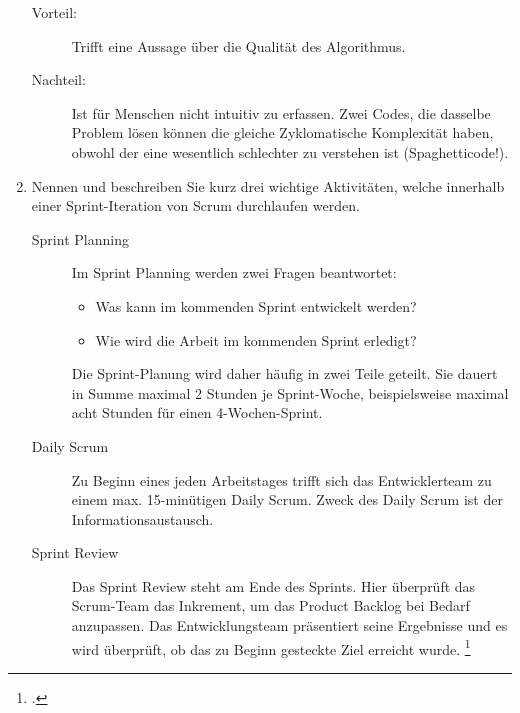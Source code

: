 \documentclass{bschlangaul-aufgabe}
\begin{document}
\begin{enumerate}
\begin{bAntwort}

\begin{description}
\item[Vorteil:]

Trifft eine Aussage über die Qualität des Algorithmus.

\item[Nachteil:]

Ist für Menschen nicht intuitiv zu erfassen. Zwei Codes, die dasselbe
Problem lösen können die gleiche Zyklomatische Komplexität haben, obwohl
der eine wesentlich schlechter zu verstehen ist (Spaghetticode!).
\end{description}
\end{bAntwort}


\item Nennen und beschreiben Sie kurz drei wichtige Aktivitäten, welche
innerhalb einer Sprint-Iteration von Scrum durchlaufen werden.

\begin{bAntwort}
\begin{description}
\item[Sprint Planning]

Im Sprint Planning werden zwei Fragen beantwortet:

\begin{itemize}
\item Was kann im kommenden Sprint entwickelt werden?
\item Wie wird die Arbeit im kommenden Sprint erledigt?
\end{itemize}

Die Sprint-Planung wird daher häufig in zwei Teile geteilt. Sie dauert
in Summe maximal 2 Stunden je Sprint-Woche, beispielsweise maximal acht
Stunden für einen 4-Wochen-Sprint.

\item[Daily Scrum]

Zu Beginn eines jeden Arbeitstages trifft sich das Entwicklerteam zu
einem max. 15-minütigen Daily Scrum. Zweck des Daily Scrum ist der
Informationsaustausch.

\item[Sprint Review]

Das Sprint Review steht am Ende des Sprints. Hier überprüft das
Scrum-Team das Inkrement, um das Product Backlog bei Bedarf anzupassen.
Das Entwicklungsteam präsentiert seine Ergebnisse und es wird überprüft,
ob das zu Beginn gesteckte Ziel erreicht wurde.
\footcite{wiki:scrum}
\end{description}
\end{bAntwort}


\end{enumerate}
\end{document}
